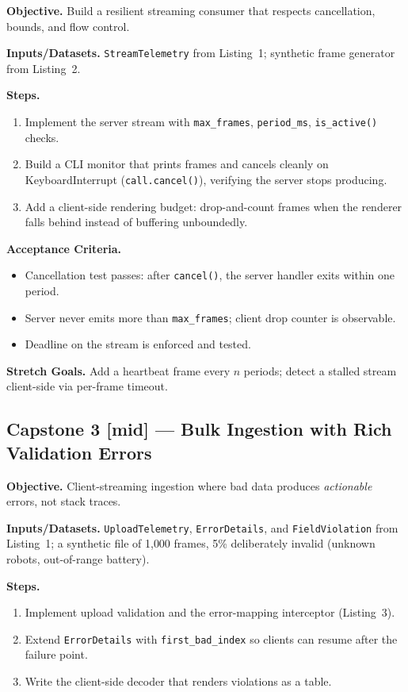 \textbf{Objective.} Build a resilient streaming consumer that respects
cancellation, bounds, and flow control.

\textbf{Inputs/Datasets.} \texttt{StreamTelemetry} from Listing~1; synthetic
frame generator from Listing~2.

\textbf{Steps.}
\begin{enumerate}
  \item Implement the server stream with \texttt{max\_frames},
        \texttt{period\_ms}, \texttt{is\_active()} checks.
  \item Build a CLI monitor that prints frames and cancels cleanly on
        KeyboardInterrupt (\texttt{call.cancel()}), verifying the server stops
        producing.
  \item Add a client-side rendering budget: drop-and-count frames when the
        renderer falls behind instead of buffering unboundedly.
\end{enumerate}

\textbf{Acceptance Criteria.}
\begin{itemize}
  \item[$\square$] Cancellation test passes: after \texttt{cancel()}, the
        server handler exits within one period.
  \item[$\square$] Server never emits more than \texttt{max\_frames}; client
        drop counter is observable.
  \item[$\square$] Deadline on the stream is enforced and tested.
\end{itemize}

\textbf{Stretch Goals.} Add a heartbeat frame every $n$ periods; detect a
stalled stream client-side via per-frame timeout.

\subsection{Capstone 3 [mid] --- Bulk Ingestion with Rich Validation Errors}

\textbf{Objective.} Client-streaming ingestion where bad data produces
\emph{actionable} errors, not stack traces.

\textbf{Inputs/Datasets.} \texttt{UploadTelemetry}, \texttt{ErrorDetails}, and
\texttt{FieldViolation} from Listing~1; a synthetic file of 1{,}000 frames,
5\% deliberately invalid (unknown robots, out-of-range battery).

\textbf{Steps.}
\begin{enumerate}
  \item Implement upload validation and the error-mapping interceptor
        (Listing~3).
  \item Extend \texttt{ErrorDetails} with \texttt{first\_bad\_index} so clients
        can resume after the failure point.
  \item Write the client-side decoder that renders violations as a table.
\end{enumerate}

